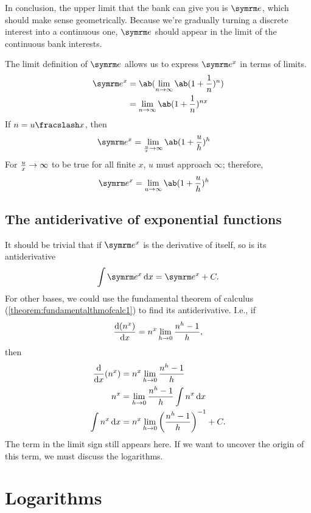 In conclusion, the upper limit that the bank can give you is $\e$, which should make sense geometrically. Because we're gradually turning a discrete interest into a continuous one, $\e$ should appear in the limit of the continuous bank interests.

The limit definition of $\e$ allows us to express $\e^x$ in terms of limits.
\begin{align}
	\e^x &= \ab(\lim_{n \appr \infty}\ab(1 + \frac{1}{n})^n) \\
		 &= \lim_{n \appr \infty}\ab(1 + \frac{1}{n})^{nx}
\end{align}
If $n = \flatfrac{u}{x}$, then
\begin{align}
	\e^x &= \lim_{\frac{u}{x} \appr \infty}\ab(1 + \frac{u}{h})^{h}
\end{align}
For $\frac{u}{x} \rightarrow \infty$ to be true for all finite $x$, $u$ must approach $\infty$; therefore,
\begin{align}
	\e^x &= \lim_{u \appr \infty}\ab(1 + \frac{u}{h})^h
\end{align}

\subsection{The antiderivative of exponential functions}

It should be trivial that if $\e^x$ is the derivative of itself, so is its antiderivative
\begin{equation}
    \int \e^x \odif{x} = \e^x + C.
\end{equation}
For other bases, we could use the fundamental theorem of calculus (\cref{theorem:fundamentalthmofcalc1}) to find its antiderivative. I.e., if
\begin{equation*}
    \odv{(n^x)}{x} = n^x\lim_{h \appr 0}\frac{n^h - 1}{h},
\end{equation*}
then
\begin{align*}
    \odv*{(n^x)}{x} &= n^x\lim_{h \appr 0}\frac{n^h - 1}{h} \\
    n^x &= \lim_{h \appr 0}\frac{n^h - 1}{h}\int n^x\odif{x} \\
    \int n^x\odif{x} &= n^x\lim_{h \appr 0}\left(\frac{n^h - 1}{h}\right)^{-1} + C.
\end{align*}
The term in the limit sign still appears here. If we want to uncover the origin of this term, we must discuss the logarithms.

\section{Logarithms}

